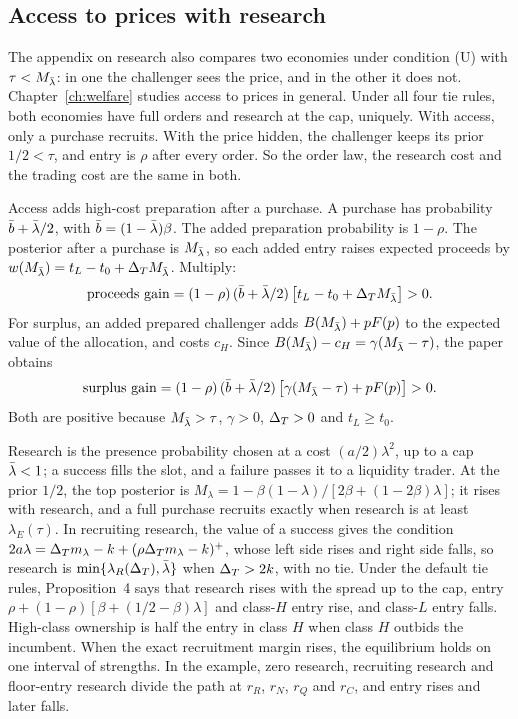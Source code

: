 \subsection{Access to prices with research}

The appendix on research also compares two economies under condition (U) with \(\tau<M_{\bar\lambda}\): in one the challenger
sees the price, and in the other it does not. Chapter~\ref{ch:welfare} studies access to prices in general. Under all
four tie rules, both economies have full orders and research at the cap, uniquely. With access, only a purchase
recruits. With the price hidden, the challenger keeps its prior \(1/2<\tau\), and entry is \(\rho\) after every order.
So the order law, the research cost and the trading cost are the same in both.

Access adds high-cost preparation after a purchase. A purchase has probability \(\bar b+\bar\lambda/2\), with
\(\bar b=(1-\bar\lambda)\beta\). The added preparation probability is \(1-\rho\). The posterior after a purchase is \(M_{\bar\lambda}\),
so each added entry raises expected proceeds by \(w(M_{\bar\lambda})=t_L-t_0+\Delta_T M_{\bar\lambda}\). Multiply:
\[
\text{proceeds gain}=(1-\rho)\,(\bar b+\bar\lambda/2)\,\bigl[t_L-t_0+\Delta_T M_{\bar\lambda}\bigr]>0 .
\]
For surplus, an added prepared challenger adds \(B(M_{\bar\lambda})+pF(p)\) to the expected value of the allocation, and costs
\(c_H\). Since \(B(M_{\bar\lambda})-c_H=\gamma(M_{\bar\lambda}-\tau)\), the paper obtains
\[
\text{surplus gain}=(1-\rho)\,(\bar b+\bar\lambda/2)\,\bigl[\gamma(M_{\bar\lambda}-\tau)+pF(p)\bigr]>0 .
\]
Both are positive because \(M_{\bar\lambda}>\tau\), \(\gamma>0\), \(\Delta_T>0\) and \(t_L\ge t_0\).

\begin{chaptersummary}
Research is the presence probability chosen at a cost \((a/2)\lambda^2\), up to a cap \(\bar\lambda<1\); a success fills the
slot, and a failure passes it to a liquidity trader. At the prior \(1/2\), the top posterior is
\(M_\lambda=1-\beta(1-\lambda)/[2\beta+(1-2\beta)\lambda]\); it rises with research, and a full purchase recruits
exactly when research is at least \(\lambda_E(\tau)\). In recruiting research, the value of a success gives the
condition \(2a\lambda=\Delta_T m_\lambda-k+(\rho\Delta_T m_\lambda-k)^+\), whose left side rises and right side falls, so research
is \(\min\{\lambda_R(\Delta_T),\bar\lambda\}\) when \(\Delta_T>2k\), with no tie. Under the default tie rules, Proposition~4 says that
research rises with the spread up to the cap, entry \(\rho+(1-\rho)[\beta+(1/2-\beta)\lambda]\) and class-\(H\) entry
rise, and class-\(L\) entry falls. High-class ownership is half the entry in class \(H\) when class \(H\) outbids the
incumbent. When the exact recruitment margin rises, the equilibrium holds on one interval of strengths. In the
example, zero research, recruiting research and floor-entry research divide the path at \(r_R\), \(r_N\), \(r_Q\) and
\(r_C\), and entry rises and later falls.
\end{chaptersummary}

